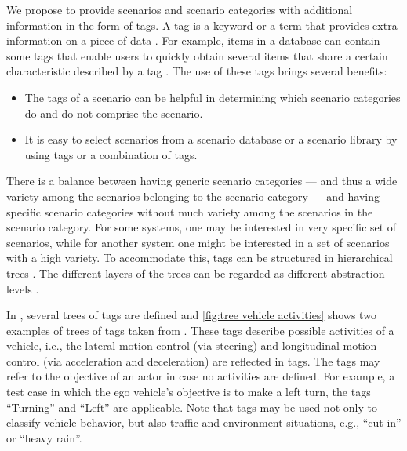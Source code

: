 We propose to provide scenarios and scenario categories with additional information in the form of tags.
A tag is a keyword or a term that provides extra information on a piece of data \autocite{smith2007tagging}. For example, items in a database can contain some tags that enable users to quickly obtain several items that share a certain characteristic described by a tag \autocite{craft2004tagging}. 
The use of these tags brings several benefits:
\begin{itemize}
	\item The tags of a scenario can be helpful in determining which scenario categories do and do not comprise the scenario.
	\item It is easy to select scenarios from a scenario database or a scenario library by using tags or a combination of tags.
\end{itemize}

There is a balance between having generic scenario categories --- and thus a wide variety among the scenarios belonging to the scenario category --- and having specific scenario categories without much variety among the scenarios in the scenario category. For some systems, one may be interested in very specific set of scenarios, while for another system one might be interested in a set of scenarios with a high variety. To accommodate this, tags can be structured in hierarchical trees \autocite{molloy2017dynamic}. The different layers of the trees can be regarded as different abstraction levels \autocite{Bonnin2014}. 

In \autocite{degelder2019scenariocategories}, several trees of tags are defined and \cref{fig:tree vehicle activities} shows two examples of trees of tags taken from \autocite{degelder2019scenariocategories}. These tags describe possible activities of a vehicle, i.e., the lateral motion control (via steering) and longitudinal motion control (via acceleration and deceleration) are reflected in tags. The tags may refer to the objective of an actor in case no activities are defined. For example, a test case in which the ego vehicle's objective is to make a left turn, the tags ``Turning'' and ``Left'' are applicable. Note that tags may be used not only to classify vehicle behavior, but also traffic and environment situations, e.g., ``cut-in'' or ``heavy rain''.

